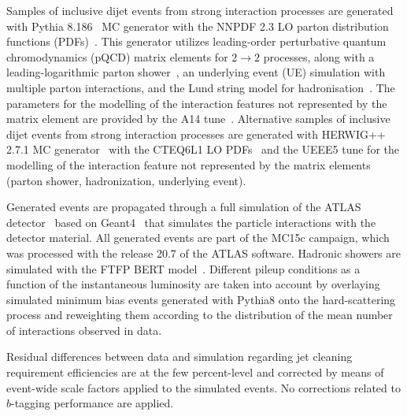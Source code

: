 Samples of inclusive dijet events from strong interaction processes are generated with Pythia 8.186~\cite{pythia} MC generator with the NNPDF 2.3 LO parton distribution functions (PDFs)~\cite{nnpdflo}. This generator utilizes leading-order perturbative quantum chromodynamics (pQCD) matrix elements for $2\rightarrow 2$ processes, along with a leading-logarithmic parton shower~\cite{pythia_ps}, an underlying event (UE) simulation with multiple parton interactions, and the Lund string model for hadronisation~\cite{pythia_hadron}. The parameters for the modelling of the interaction features not represented by the matrix element are provided by the A14 tune~\cite{a14_tune}. Alternative samples of inclusive dijet events from strong interaction processes are generated with HERWIG++ 2.7.1 MC generator~\cite{herwig_pp} with the CTEQ6L1 LO PDFs~\cite{cteqlo} and the UEEE5 tune for the modelling of the interaction feature not represented by the matrix elements (parton shower, hadronization, underlying event).

Generated events are propagated through a full simulation of the ATLAS detector~\cite{SOFT-2010-01} based on Geant4~\cite{geant4} that simulates the particle interactions with the detector material. All generated events are part of the MC15c campaign, which was processed with the release 20.7 of the ATLAS software. Hadronic showers are simulated with the FTFP BERT model~\cite{string_geant4}. Different pileup conditions as a function of the instantaneous luminosity are taken into account by overlaying simulated minimum bias events generated with Pythia8 onto the hard-scattering process and reweighting them according to the distribution of the mean number of interactions observed in data. 

Residual differences between data and simulation regarding jet cleaning requirement efficiencies are at the few percent-level and corrected by means of event-wide scale factors applied to the simulated events. No corrections related to $b$-tagging performance are applied.
